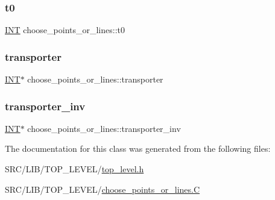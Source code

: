 \subsubsection{\texorpdfstring{t0}{t0}}
{\footnotesize\ttfamily \mbox{\hyperlink{galois_8h_a09fddde158a3a20bd2dcadb609de11dc}{I\+NT}} choose\+\_\+points\+\_\+or\+\_\+lines\+::t0}

\mbox{\label{classchoose__points__or__lines_a0f8269ae48e76984b6cdbd0c25087159}} 
\subsubsection{\texorpdfstring{transporter}{transporter}}
{\footnotesize\ttfamily \mbox{\hyperlink{galois_8h_a09fddde158a3a20bd2dcadb609de11dc}{I\+NT}}$\ast$ choose\+\_\+points\+\_\+or\+\_\+lines\+::transporter}

\mbox{\label{classchoose__points__or__lines_a234146c3e48b5e4e26d73c273f5e9cf1}} 
\subsubsection{\texorpdfstring{transporter\+\_\+inv}{transporter\_inv}}
{\footnotesize\ttfamily \mbox{\hyperlink{galois_8h_a09fddde158a3a20bd2dcadb609de11dc}{I\+NT}}$\ast$ choose\+\_\+points\+\_\+or\+\_\+lines\+::transporter\+\_\+inv}



The documentation for this class was generated from the following files\+:\begin{DoxyCompactItemize}
\item 
S\+R\+C/\+L\+I\+B/\+T\+O\+P\+\_\+\+L\+E\+V\+E\+L/\mbox{\hyperlink{top__level_8h}{top\+\_\+level.\+h}}\item 
S\+R\+C/\+L\+I\+B/\+T\+O\+P\+\_\+\+L\+E\+V\+E\+L/\mbox{\hyperlink{choose__points__or__lines_8_c}{choose\+\_\+points\+\_\+or\+\_\+lines.\+C}}\end{DoxyCompactItemize}
